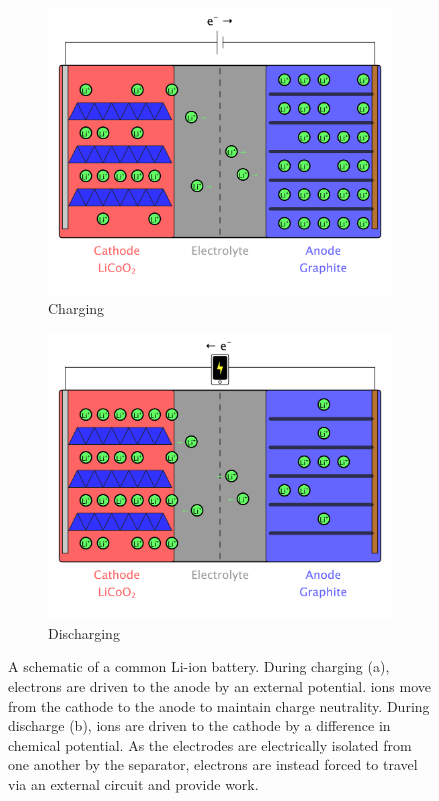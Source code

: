 \begin{figure}
\centering
\begin{subfigure}{\linewidth}
  \centering
  \includegraphics[width=0.7\linewidth, trim=1cm 1cm 1cm 1cm, clip]{figures/batteryCharge/batteryCharge}
  \caption{Charging}
  \label{fig:GoodenoughCharging}
\end{subfigure}

\begin{subfigure}{\linewidth}
  \centering
  \includegraphics[width=0.7\linewidth, trim=1cm 1cm 1cm 1cm, clip]{figures/batteryDischarge/batteryDischarge}
  \caption{Discharging}
  \label{fig:GoodenoughDischarging}
\end{subfigure}
\caption[Li-ion battery schematic]{A schematic of a common Li-ion battery. During charging (a), electrons are driven to the anode by an external potential.  ions move from the cathode to the anode to maintain charge neutrality. During discharge (b),  ions are driven to the cathode by a difference in chemical potential. As the electrodes are electrically isolated from one another by the separator, electrons are instead forced to travel via an external circuit and provide work.} 
\label{fig:Goodenough}
\end{figure}

